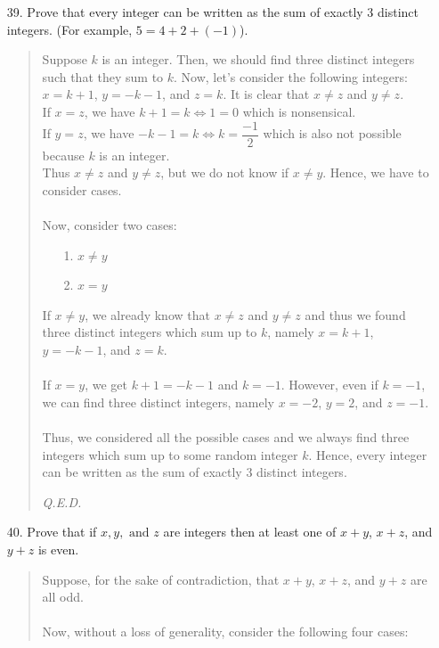\documentclass[12pt, a4paper]{article}                      %
\begin{document}
\begin{itemize}
\item[39.]
Prove that every integer can be written as the sum of exactly 3 distinct integers. (For
example, $5 = 4 + 2 + (-1)$).
\begin{quote}
Suppose $k$ is an integer. Then, we should find three distinct integers such that they sum to $k$.
Now, let's consider the following integers:\\
$x = k + 1$, $y = -k - 1$, and $z = k$. It is clear that $x \neq z$ and $y \neq z$.\\
If $x = z$, we have $k + 1 = k \iff 1 = 0$ which is nonsensical.\\
If $y = z$, we have $-k - 1 = k \iff k = \dfrac{-1}{2}$ which is also
not possible because $k$ is an integer.\\
Thus $x \neq z$ and $y \neq z$, but we do not know if $x \neq y$.
Hence, we have to consider cases.
\\\\
Now, consider two cases:
\begin{itemize}
\item[1.]
$x \neq y$
\item[2.]
$x = y$
\end{itemize}
If $x \neq y$, we already know that $x \neq z$ and $y \neq z$ and thus we found three distinct integers which sum up to $k$, namely $x = k + 1$, $y = -k - 1$, and $z = k$.
\\\\
If $x = y$, we get $k + 1 = -k - 1$ and $k = -1$. However, even if $k = -1$, we can find three distinct integers, namely $x = -2$, $y = 2$, and $z = -1$.\\\\
Thus, we considered all the possible cases and we always find three integers which sum up to some random integer $k$.
Hence, every integer can be written as the sum of exactly 3 distinct integers.
\begin{flushright}
\textit{Q.E.D.}
\end{flushright}
\end{quote}
\item[40.]
Prove that if $x, y, \mbox{ and } z$ are integers then at least one of $x + y$, $x + z$, and $y + z$ is even.
\begin{quote}
Suppose, for the sake of contradiction, that $x + y$, $x + z$, and $y + z$ are all odd.\\\\
Now, without a loss of generality, consider the following four cases:
\begin{itemize}

\end{itemize}
\end{quote}
\end{itemize}
\end{document}
